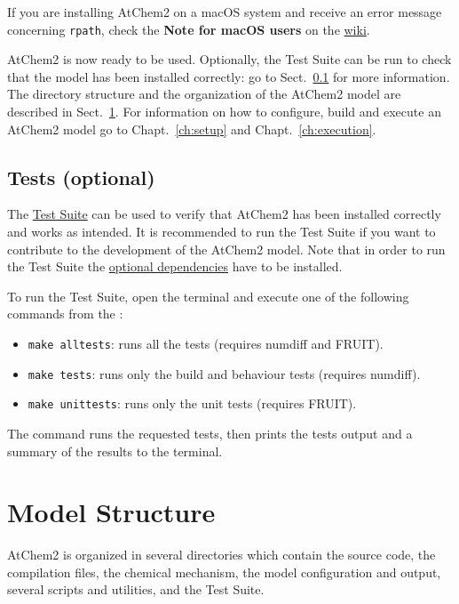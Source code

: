 If you are installing AtChem2 on a macOS system and receive an error message
concerning \texttt{rpath}, check the \textbf{Note for macOS users} on the
\href{https://github.com/AtChem/AtChem2/wiki/How-to-install-AtChem2}{wiki}.

AtChem2 is now ready to be used. Optionally, the Test Suite can be run
to check that the model has been installed correctly: go to
Sect.~\ref{subsec:tests-optional} for more information. The directory
structure and the organization of the AtChem2 model are described in
Sect.~\ref{sec:model-structure}. For information on how to configure,
build and execute an AtChem2 model go to Chapt.~\ref{ch:setup} and
Chapt.~\ref{ch:execution}.

\subsection{Tests (optional)} \label{subsec:tests-optional}

The \hyperref[sec:test-suite]{Test Suite} can be used to verify that
AtChem2 has been installed correctly and works as intended. It is
recommended to run the Test Suite if you want to contribute to the
development of the AtChem2 model. Note that in order to run the Test
Suite the \hyperref[subsec:optional-dependencies]{optional dependencies}
have to be installed.

To run the Test Suite, open the terminal and execute one of the
following commands from the \maindir:

\begin{itemize}
\item \verb|make alltests|: runs all the tests (requires numdiff and
  FRUIT).
\item \verb|make tests|: runs only the build and behaviour tests
  (requires numdiff).
\item \verb|make unittests|: runs only the unit tests (requires
  FRUIT).
\end{itemize}

The command runs the requested tests, then prints the tests output and
a summary of the results to the terminal.

\section{Model Structure} \label{sec:model-structure}

AtChem2 is organized in several directories which contain the source
code, the compilation files, the chemical mechanism, the model
configuration and output, several scripts and utilities, and the Test
Suite.

